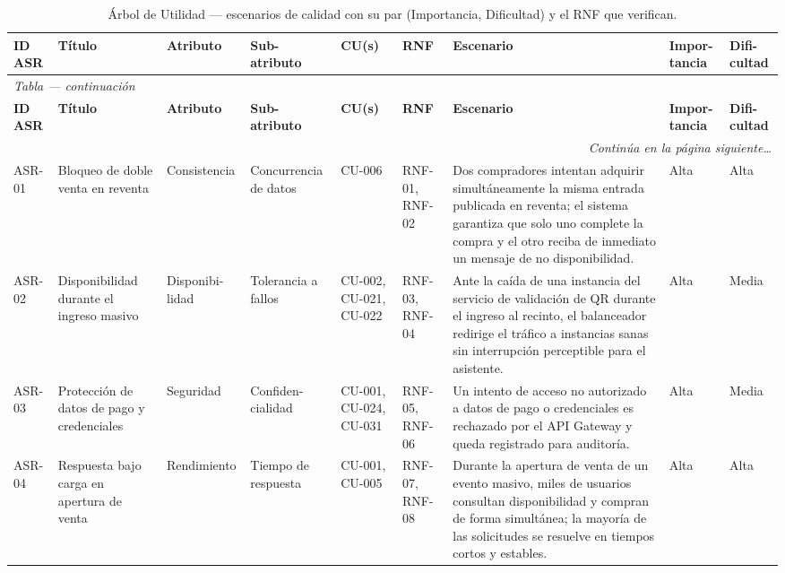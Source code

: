 \documentclass[11pt,a4paper]{article}
\begin{document}
\begin{landscape}
\begin{center}
\begin{longtable}{|p{1cm}|p{2.9cm}|p{2.1cm}|p{2.3cm}|p{1.7cm}|p{1.5cm}|p{6.1cm}|p{1.4cm}|p{1.4cm}|}
\caption{Árbol de Utilidad --- escenarios de calidad con su par (Importancia, Dificultad) y el
RNF que verifican.}\label{tab:asr}\\
\hline
\textbf{ID ASR} & \textbf{Título} & \textbf{Atributo} & \textbf{Sub-atributo} &
\textbf{CU(s)} & \textbf{RNF} & \textbf{Escenario} & \textbf{Impor-tancia} &
\textbf{Difi-cultad}\\
\hline
\endfirsthead
\multicolumn{9}{l}{\small\textit{Tabla \thetable{} --- continuación}}\\
\hline
\textbf{ID ASR} & \textbf{Título} & \textbf{Atributo} & \textbf{Sub-atributo} &
\textbf{CU(s)} & \textbf{RNF} & \textbf{Escenario} & \textbf{Impor-tancia} &
\textbf{Difi-cultad}\\
\hline
\endhead
\hline
\multicolumn{9}{r}{\small\textit{Continúa en la página siguiente\ldots}}\\
\endfoot
\hline
\endlastfoot
ASR-01 & Bloqueo de doble venta en reventa & Consistencia & Concurrencia de datos & CU-006 &
RNF-01, RNF-02 & Dos compradores intentan adquirir simultáneamente la misma entrada publicada en
reventa; el sistema garantiza que solo uno complete la compra y el otro reciba de inmediato un
mensaje de no disponibilidad. & Alta & Alta\\
\hline
ASR-02 & Disponibilidad durante el ingreso masivo & Disponibi-lidad & Tolerancia a fallos &
CU-002, CU-021, CU-022 & RNF-03, RNF-04 & Ante la caída de una instancia del servicio de
validación de QR durante el ingreso al recinto, el balanceador redirige el tráfico a instancias
sanas sin interrupción perceptible para el asistente. & Alta & Media\\
\hline
ASR-03 & Protección de datos de pago y credenciales & Seguridad & Confiden-cialidad & CU-001,
CU-024, CU-031 & RNF-05, RNF-06 & Un intento de acceso no autorizado a datos de pago o
credenciales es rechazado por el API Gateway y queda registrado para auditoría. & Alta &
Media\\
\hline
ASR-04 & Respuesta bajo carga en apertura de venta & Rendimiento & Tiempo de respuesta & CU-001,
CU-005 & RNF-07, RNF-08 & Durante la apertura de venta de un evento masivo, miles de usuarios
consultan disponibilidad y compran de forma simultánea; la mayoría de las solicitudes se resuelve
en tiempos cortos y estables. & Alta & Alta\\

\end{longtable}
\end{center}
\end{landscape}
\end{document}
